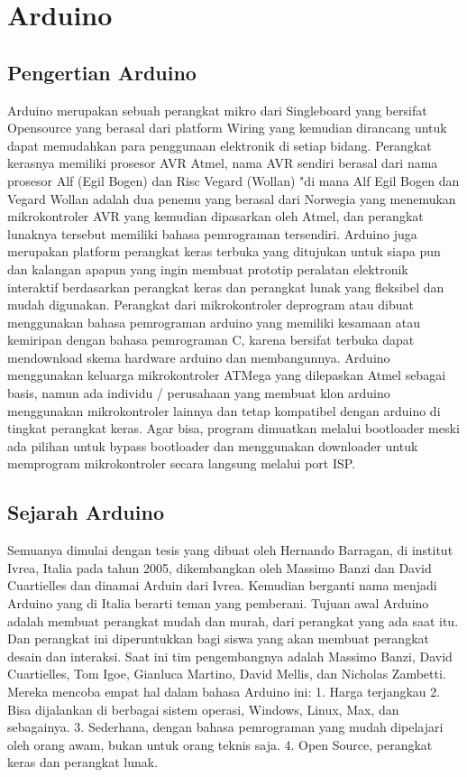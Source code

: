 \section{Arduino}
\subsection{Pengertian Arduino}
Arduino merupakan sebuah perangkat mikro dari Singleboard yang bersifat Opensource yang berasal dari platform Wiring yang kemudian dirancang untuk dapat memudahkan para penggunaan elektronik di setiap bidang. Perangkat kerasnya memiliki prosesor AVR Atmel, nama AVR sendiri berasal dari nama prosesor Alf (Egil Bogen) dan Risc Vegard (Wollan) "di mana Alf Egil Bogen dan Vegard Wollan adalah dua penemu yang berasal dari Norwegia yang menemukan mikrokontroler AVR yang kemudian dipasarkan oleh Atmel, dan perangkat lunaknya tersebut memiliki bahasa pemrograman tersendiri. 
Arduino juga merupakan platform perangkat keras terbuka yang ditujukan untuk siapa pun dan kalangan apapun yang ingin membuat prototip peralatan elektronik interaktif berdasarkan perangkat keras dan perangkat lunak yang fleksibel dan mudah digunakan. Perangkat dari mikrokontroler deprogram atau dibuat menggunakan bahasa pemrograman arduino yang memiliki kesamaan atau kemiripan dengan bahasa pemrograman C, karena bersifat terbuka dapat mendownload skema hardware arduino dan membangunnya. 
Arduino menggunakan keluarga mikrokontroler ATMega yang dilepaskan Atmel sebagai basis, namun ada individu / perusahaan yang membuat klon arduino menggunakan mikrokontroler lainnya dan tetap kompatibel dengan arduino di tingkat perangkat keras. Agar bisa, program dimuatkan melalui bootloader meski ada pilihan untuk bypass bootloader dan menggunakan downloader untuk memprogram mikrokontroler secara langsung melalui port ISP.

\subsection{Sejarah Arduino}
Semuanya dimulai dengan tesis yang dibuat oleh Hernando Barragan, di institut Ivrea, Italia pada tahun 2005, dikembangkan oleh Massimo Banzi dan David Cuartielles dan dinamai Arduin dari Ivrea. Kemudian berganti nama menjadi Arduino yang di Italia berarti teman yang pemberani.
Tujuan awal Arduino adalah membuat perangkat mudah dan murah, dari perangkat yang ada saat itu. Dan perangkat ini diperuntukkan bagi siswa yang akan membuat perangkat desain dan interaksi.
Saat ini tim pengembangnya adalah Massimo Banzi, David Cuartielles, Tom Igoe, Gianluca Martino, David Mellis, dan Nicholas Zambetti. Mereka mencoba empat hal dalam bahasa Arduino ini:
1. Harga terjangkau
2. Bisa dijalankan di berbagai sistem operasi, Windows, Linux, Max, dan sebagainya.
3. Sederhana, dengan bahasa pemrograman yang mudah dipelajari oleh orang awam, bukan untuk orang teknis saja.
4. Open Source, perangkat keras dan perangkat lunak.


